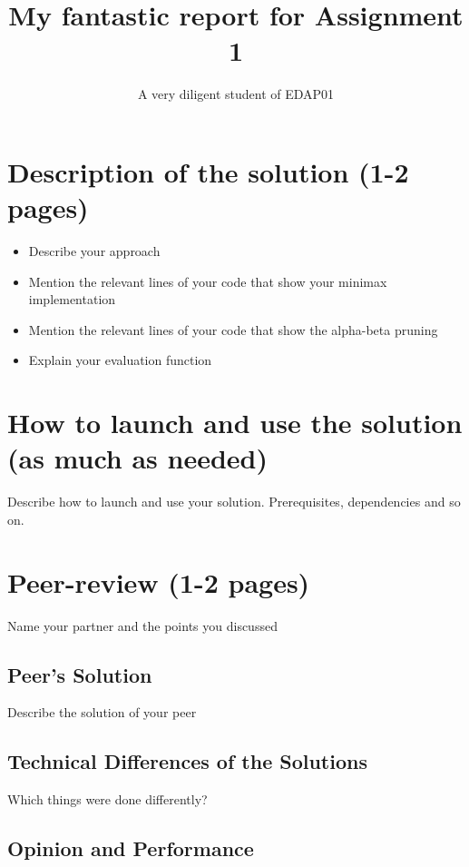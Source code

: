 \documentclass[a4paper]{article}
\title{My fantastic report for Assignment 1}
\author{A very diligent student of EDAP01}
\begin{document}
\maketitle

\section{Description of the solution (1-2 pages)}


\begin{itemize}
\item Describe your approach
\item Mention the relevant lines of your code that show your minimax implementation
\item Mention the relevant lines of your code that show the alpha-beta pruning
\item Explain your evaluation function
\end{itemize}

\section{How to launch and use the solution (as much as needed)}



Describe how to launch and use your solution. Prerequisites, dependencies and so on.

\section{Peer-review (1-2 pages)}


Name your partner and the points you discussed


\subsection{Peer's Solution}

Describe the solution of your peer

\subsection{Technical Differences of the Solutions}

Which things were done differently?

\subsection{Opinion and Performance}
\end{document}
